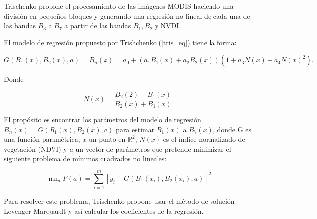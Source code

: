 Trischenko propone el procesamiento de las imágenes MODIS haciendo una división en pequeños bloques y generando una regresión no lineal de cada una de las bandas  $B_{3}$ a $B_{7}$ a partir de las bandas $B_{1}, B_{2}$ y NVDI. 

El modelo de regresión propuesto por Trishchenko (\ref{tris_eq}) tiene la forma: 

\begin{equation}\label{tris_eq}
G(B_{1}(x), B_{2}(x),a) = B_{n}(x) = a_{0} + (a_{1}B_{1}(x) + a_{2}B_{2}(x))(1 + a_{3}N(x) + a_{4}N(x)^{2}).
\end{equation}

Donde 

\begin{equation}
N(x) =  \frac{B_{2}(2)-B_{1}(x)}{B_{2}(x) + B_{1}(x)}.
\end{equation}

El propósito es encontrar los parámetros del modelo de regresión $B_{n}(x) = G(B_{1}(x), B_{2}(x), a)$ para estimar $B_{1}(x)$ a $B_{7}(x)$, donde G es una función paramétrica, $x$ un punto en $\mathbb{R}^{2}$, $N(x)$ es el índice normalizado de vegetación (NDVI) y $a$ un vector de parámetros que pretende minimizar el siguiente problema de mínimos cuadrados no lineales: 

\begin{equation}
\mathop{m\acute{i}n}_{a} F(a) = \sum_{i=1}^{m} [y_{i} - G(B_{1}(x_{i}), B_{2}(x_{i}),a)]^{2}
\end{equation}

Para resolver este problema, Trischenko propone usar el método de solución Levenger-Marquardt y así calcular los coeficientes de la regresión. 


